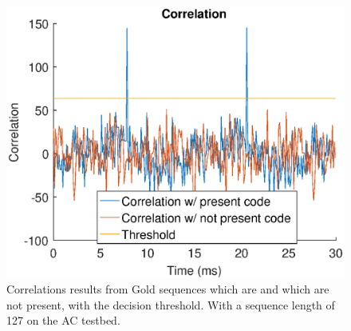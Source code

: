 \begin{figure}[htb]
	\centering
	\includegraphics[angle=0,width=\textwidth,keepaspectratio]{chapters/evaluation-chapters/hardware/ac/correlation-ac-testbed.eps}
	\caption{Correlations results from Gold sequences which are and which are not present, with the decision threshold. With a sequence length of 127 on the AC testbed.}
	\label{fig:correlation-ac-testbed}
\end{figure}







